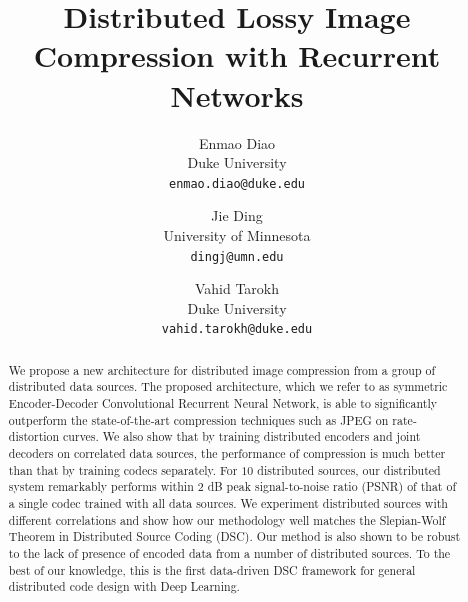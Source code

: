 \documentclass[10pt,twocolumn,letterpaper]{article}
\begin{document}
\title{Distributed Lossy Image Compression with Recurrent Networks}

\author{Enmao Diao\\
Duke University\\
{\tt\small enmao.diao@duke.edu}
\and
Jie Ding\\
University of Minnesota\\
{\tt\small dingj@umn.edu}
\and
Vahid Tarokh\\
Duke University\\
{\tt\small vahid.tarokh@duke.edu}
}

\maketitle


\begin{abstract}
We propose a new architecture for distributed image compression from a group of distributed data sources. The proposed architecture, which we refer to as symmetric Encoder-Decoder Convolutional Recurrent Neural Network, is able to significantly outperform the state-of-the-art compression techniques such as JPEG on rate-distortion curves. We also show that by training distributed encoders and joint decoders on correlated data sources, the performance of compression is much better than that by training codecs separately. For $10$ distributed sources, our distributed system remarkably performs within 2 dB peak signal-to-noise ratio (PSNR) of that of a single codec trained with all data sources. We experiment distributed sources with different correlations and show how our methodology well matches the Slepian-Wolf Theorem in Distributed Source Coding (DSC). Our method is also shown to be robust to the lack of presence of encoded data from a number of distributed sources. To the best of our knowledge, this is the first data-driven DSC framework for general distributed code design with Deep Learning.

\end{abstract}

\end{document}
